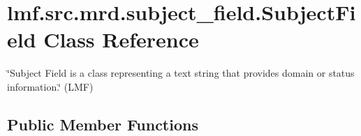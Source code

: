 \hypertarget{classlmf_1_1src_1_1mrd_1_1subject__field_1_1_subject_field}{\section{lmf.\+src.\+mrd.\+subject\+\_\+field.\+Subject\+Field Class Reference}
\label{classlmf_1_1src_1_1mrd_1_1subject__field_1_1_subject_field}
}


\char`\"{}\+Subject Field is a class representing a text string that provides domain or status information.\char`\"{} (L\+M\+F)  


\subsection*{Public Member Functions}
